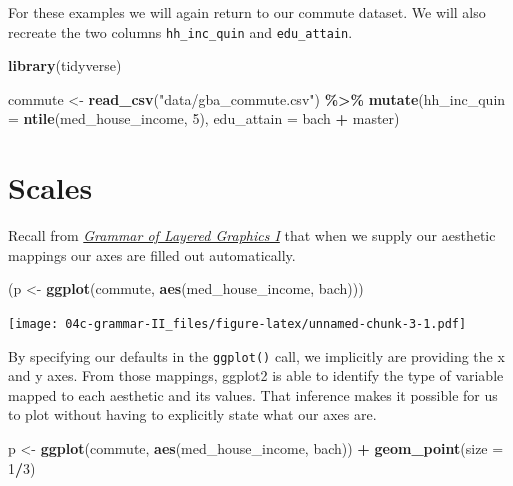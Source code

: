 \documentclass[
]{book}
\newenvironment{Shaded}{\begin{snugshade}}{\end{snugshade}}
\newcommand{\DataTypeTok}[1]{\textcolor[rgb]{0.13,0.29,0.53}{#1}}
\newcommand{\DecValTok}[1]{\textcolor[rgb]{0.00,0.00,0.81}{#1}}
\newcommand{\KeywordTok}[1]{\textcolor[rgb]{0.13,0.29,0.53}{\textbf{#1}}}
\newcommand{\NormalTok}[1]{#1}
\newcommand{\OperatorTok}[1]{\textcolor[rgb]{0.81,0.36,0.00}{\textbf{#1}}}
\newcommand{\StringTok}[1]{\textcolor[rgb]{0.31,0.60,0.02}{#1}}
\begin{document}
For these examples we will again return to our commute dataset. We will also recreate the two columns \texttt{hh\_inc\_quin} and \texttt{edu\_attain}.

\begin{Shaded}
\begin{Highlighting}[]
\KeywordTok{library}\NormalTok{(tidyverse)}

\NormalTok{commute \textless{}{-}}\StringTok{ }\KeywordTok{read\_csv}\NormalTok{(}\StringTok{"data/gba\_commute.csv"}\NormalTok{) }\OperatorTok{\%\textgreater{}\%}\StringTok{ }
\StringTok{  }\KeywordTok{mutate}\NormalTok{(}\DataTypeTok{hh\_inc\_quin =} \KeywordTok{ntile}\NormalTok{(med\_house\_income, }\DecValTok{5}\NormalTok{),}
         \DataTypeTok{edu\_attain =}\NormalTok{ bach }\OperatorTok{+}\StringTok{ }\NormalTok{master)}
\end{Highlighting}
\end{Shaded}

\hypertarget{scales}{%
\section{Scales}\label{scales}}

Recall from \emph{\protect\hyperlink{layered-i}{Grammar of Layered Graphics I}} that when we supply our aesthetic mappings our axes are filled out automatically.

\begin{Shaded}
\begin{Highlighting}[]
\NormalTok{(p \textless{}{-}}\StringTok{ }\KeywordTok{ggplot}\NormalTok{(commute, }\KeywordTok{aes}\NormalTok{(med\_house\_income, bach)))}
\end{Highlighting}
\end{Shaded}

\texttt{[image: 04c-grammar-II\_files/figure-latex/unnamed-chunk-3-1.pdf]}

By specifying our defaults in the \texttt{ggplot()} call, we implicitly are providing the x and y axes. From those mappings, ggplot2 is able to identify the type of variable mapped to each aesthetic and its values. That inference makes it possible for us to plot without having to explicitly state what our axes are.

\begin{Shaded}
\begin{Highlighting}[]
\NormalTok{p \textless{}{-}}\StringTok{ }\KeywordTok{ggplot}\NormalTok{(commute, }\KeywordTok{aes}\NormalTok{(med\_house\_income, bach)) }\OperatorTok{+}
\StringTok{  }\KeywordTok{geom\_point}\NormalTok{(}\DataTypeTok{size =} \DecValTok{1}\OperatorTok{/}\DecValTok{3}\NormalTok{)}
\end{Highlighting}
\end{Shaded}
\end{document}
